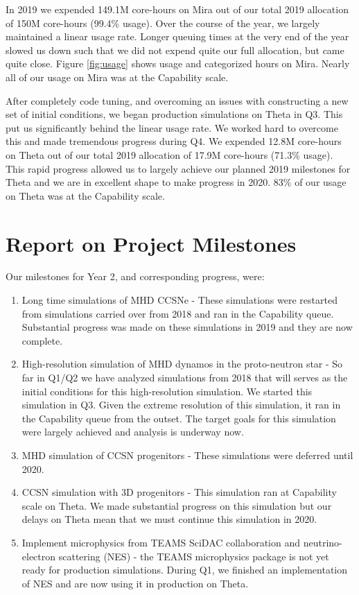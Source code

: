 \documentclass[12pt,titlepage]{article}
\begin{document}
In 2019 we expended 149.1M core-hours on Mira out of our total 2019 allocation of 150M core-hours (99.4\% usage). 
Over the course of the year, we largely maintained a linear usage rate.
Longer queuing times at the very end of the year slowed us down such that we did not expend quite our full allocation, but came quite close.
Figure \ref{fig:usage} shows usage and categorized hours on Mira.
Nearly all of our usage on Mira was at the Capability scale.

After completely code tuning, and overcoming an issues with constructing a new set of initial conditions, we began production simulations on Theta in Q3. 
This put us significantly behind the linear usage rate.
We worked hard to overcome this and made tremendous progress during Q4.
We expended 12.8M core-hours on Theta out of our total 2019 allocation of 17.9M core-hours (71.3\% usage). 
This rapid progress allowed us to largely achieve our planned 2019 milestones for Theta and we are in excellent shape to make progress in 2020.
83\% of our usage on Theta was at the Capability scale.

\section{Report on Project Milestones}

Our milestones for Year 2, and corresponding progress, were:
\begin{enumerate}
    \item Long time simulations of MHD CCSNe - These simulations were restarted from simulations carried over from 2018 and ran in the Capability queue. Substantial progress was made on these simulations in 2019 and they are now complete.
    \item High-resolution simulation of MHD dynamos in the proto-neutron star - So far in Q1/Q2 we have analyzed simulations from 2018 that will serves as the initial conditions for this high-resolution simulation. We started this simulation in Q3. Given the extreme resolution of this simulation, it ran in the Capability queue from the outset. The target goals for this simulation were largely achieved and analysis is underway now.
    \item MHD simulation of CCSN progenitors - These simulations were deferred until 2020.
    \item CCSN simulation with 3D progenitors - This simulation ran at Capability scale on Theta. We made substantial progress on this simulation but our delays on Theta mean that we must continue this simulation in 2020.
    \item Implement microphysics from TEAMS SciDAC collaboration and neutrino-electron scattering (NES) - the TEAMS microphysics package is not yet ready for production simulations. During Q1, we finished an implementation of NES and are now using it in production on Theta.
\end{enumerate}
\end{document}
